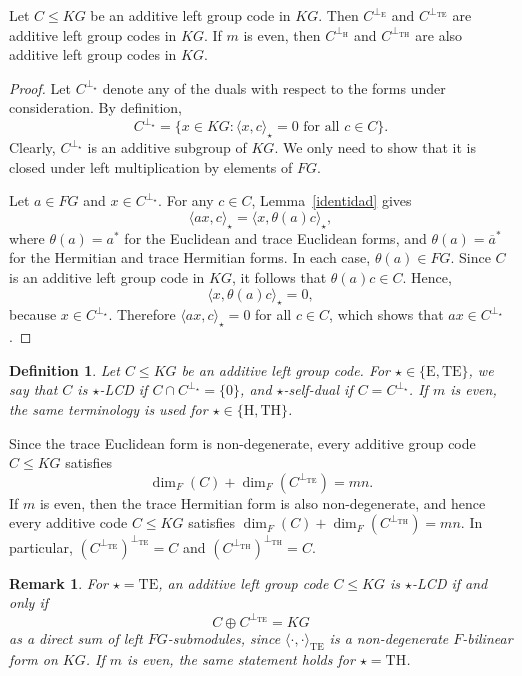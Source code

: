 \documentclass[11pt]{article}
\newtheorem{remark}[theorem]{Remark}
\newtheorem{definition}[theorem]{Definition}
\begin{document}
\begin{proposition}
Let $C \leq KG$ be an additive left group code in $KG$. Then $C^{\perp_{\mathrm{E}}}$ and $C^{\perp_{\mathrm{TE}}}$ are additive left group codes in $KG$. If $m$ is even, then $C^{\perp_{\mathrm{H}}}$ and $C^{\perp_{\mathrm{TH}}}$ are also additive left group codes in $KG$.
\end{proposition}
\begin{proof}
Let $C^{\perp_\star}$ denote any of the duals with respect to the forms under consideration. By definition,
$$
C^{\perp_\star}=\{x\in KG:\langle x,c\rangle_\star=0 \text{ for all } c\in C\}.
$$
Clearly, $C^{\perp_\star}$ is an additive subgroup of $KG$. We only need to show that it is closed under left multiplication by elements of $FG$.

Let $a\in FG$ and $x\in C^{\perp_\star}$. For any $c\in C$, Lemma~\ref{identidad} gives
$$
\langle ax,c\rangle_\star=\langle x,\theta(a)c\rangle_\star,
$$
where $\theta(a)=a^\ast$ for the Euclidean and trace Euclidean forms, and $\theta(a)=\overline{a}^\ast$ for the Hermitian and trace Hermitian forms. In each case, $\theta(a)\in FG$. Since $C$ is an additive left group code in $KG$, it follows that $\theta(a)c\in C$. Hence,
$$
\langle x,\theta(a)c\rangle_\star=0,
$$
because $x\in C^{\perp_\star}$. Therefore $\langle ax,c\rangle_\star=0$ for all $c\in C$, which shows that $ax\in C^{\perp_\star}$.
\end{proof}
\begin{definition}
Let $C \leq KG$ be an additive left group code. For $\star\in\{\mathrm{E},\mathrm{TE}\}$, we say that $C$ is \emph{$\star$-LCD} if $C\cap C^{\perp_{\star}}=\{0\}$, and \emph{$\star$-self-dual} if $C=C^{\perp_{\star}}$. If $m$ is even, the same terminology is used for $\star\in\{\mathrm{H},\mathrm{TH}\}$.
\end{definition}


Since the trace Euclidean form is non-degenerate, every additive group code $C \leq KG$ satisfies
$$
\dim_F(C)+\dim_F(C^{\perp_{\mathrm{TE}}})=mn.
$$
If $m$ is even, then the trace Hermitian form is also non-degenerate, and hence every additive code $C \leq KG$ satisfies
$
\dim_F(C)+\dim_F(C^{\perp_{\mathrm{TH}}})=mn.
$
In particular,
$
\left(C^{\perp_{\mathrm{TE}}}\right)^{\perp_{\mathrm{TE}}}=C$ and
$\left(C^{\perp_{\mathrm{TH}}}\right)^{\perp_{\mathrm{TH}}}=C.
$


\begin{remark}
For $\star=\mathrm{TE}$, an additive left group code $C \leq KG$ is $\star$-LCD if and only if
$$
C\oplus C^{\perp_{\mathrm{TE}}}=KG
$$
as a direct sum of left $FG$-submodules, since $\langle\cdot,\cdot\rangle_{\mathrm{TE}}$ is a non-degenerate $F$-bilinear form on $KG$. If $m$ is even, the same statement holds for $\star=\mathrm{TH}$.
\end{remark}
\end{document}
